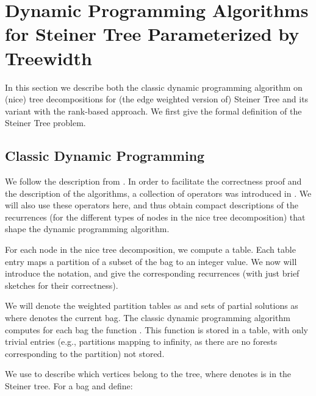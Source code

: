 \documentclass{llncs}
\begin{document}
\section{Dynamic Programming Algorithms for Steiner Tree Parameterized by Treewidth}\label{theory}
In this section we describe both the classic dynamic programming algorithm on (nice) tree
decompositions for (the edge weighted version of)
{\sc Steiner Tree} and its variant with the rank-based approach. We first give the formal definition of the {\sc Steiner Tree} problem.

\smallskip

\noindent
{}

\subsection{Classic Dynamic Programming}\label{fldp}
We follow the description from \cite{BodlaenderCKN12}. In order to facilitate the correctness proof and the description of the algorithms, a collection of operators was introduced in \cite{BodlaenderCKN12}.
We will also use these operators here, and thus obtain compact descriptions of the recurrences (for the different types of nodes in the
nice tree decomposition) that shape the dynamic programming algorithm.

For each node in the nice tree decomposition, we compute a table. Each table entry maps a partition of a subset of the bag to an integer value. 
We now will introduce the notation, and give the corresponding recurrences (with just brief sketches for their correctness).

We will denote the weighted partition tables as  and sets of partial solutions as  where  denotes the current bag. 
The classic dynamic programming algorithm computes for each bag  the function . This function is stored in a table, with only trivial
entries (e.g., partitions mapping to infinity, as there are no forests corresponding to the partition) not stored.

We use  to describe which vertices belong to the tree, where  denotes  is in the Steiner tree.
For a bag  and  define:
\end{document}
